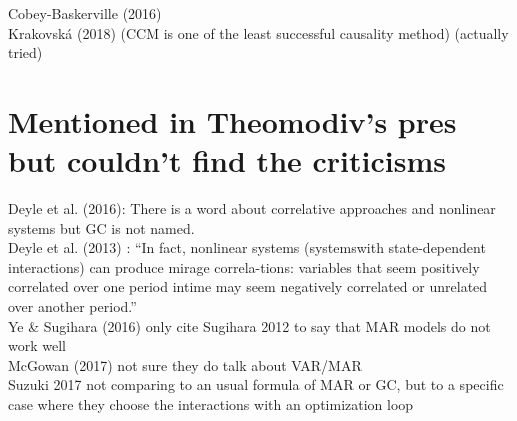 \documentclass[a4paper,10pt]{article}
\begin{document}
Cobey-Baskerville (2016) \\

Krakovská (2018) (CCM is one of the least successful causality method) (actually tried)

\section{Mentioned in Theomodiv's pres but couldn't find the criticisms}

Deyle et al. (2016): There is a word about correlative approaches and nonlinear systems but GC is not named. \\

Deyle et al. (2013) : ``In fact, nonlinear systems (systemswith state-dependent interactions) can produce mirage correla-tions: variables that seem positively correlated over one period intime may seem negatively correlated or unrelated over another period.'' \\

Ye \& Sugihara (2016) only cite Sugihara 2012 to say that MAR models do not work well\\

McGowan (2017) not sure they do talk about VAR/MAR\\

Suzuki 2017 not comparing to an usual formula of MAR or GC, but to a specific case where they choose the interactions with an optimization loop\\
\end{document}
